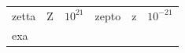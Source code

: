 {\begin{tabular}[t]{|l|l|l|l|l|l|}
    
        zetta &
    
    
        Z &
    
    
        
                \begin{math}{10}^{21}\end{math}
               &
    
    
        zepto &
    
    
        z &
    
    
        
                \begin{math}{10}^{-21}\end{math}
     \tabularnewline\cline{1-1}\cline{2-2}\cline{3-3}\cline{4-4}\cline{5-5}\cline{6-6}
    
    
        exa &
    
    

\end{tabular}}
